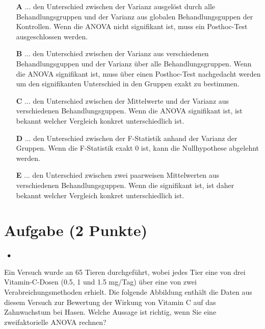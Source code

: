 \documentclass[a4paper, 9pt]{scrartcl}\usepackage[]{graphicx}\usepackage[]{xcolor}
\begin{document}
\begin{enumerate}
\item [\textbf{A} \msquare] ... den Unterschied zwischen der Varianz ausgelöst durch alle Behandlungsgruppen und der Varianz aus globalen Behandlungsguppen der Kontrollen. Wenn die ANOVA nicht signifikant ist, muss ein Posthoc-Test ausgeschlossen werden.
\item [\textbf{B} \msquare] ... den Unterschied zwischen der Varianz aus verschiedenen Behandlungsguppen und der Varianz über alle Behandlungsgruppen. Wenn die ANOVA signifikant ist, muss über einen Posthoc-Test nachgedacht werden um den signifikanten Unterschied in den Gruppen exakt zu bestimmen.
\item [\textbf{C} \msquare] ... den Unterschied zwischen der Mittelwerte und der Varianz aus verschiedenen Behandlungsguppen. Wenn die ANOVA signifikant ist, ist bekannt welcher Vergleich konkret unterschiedlich ist.
\item [\textbf{D} \msquare] ... den Unterschied zwischen der F-Statistik anhand der Varianz der Gruppen. Wenn die F-Statistik exakt 0 ist, kann die Nullhypothese abgelehnt werden.
\item [\textbf{E} \msquare] ... den Unterschied zwischen zwei paarweisen Mittelwerten aus verschiedenen Behandlungsguppen. Wenn die signifikant ist, ist daher bekannt welcher Vergleich konkret unterschiedlich ist.
\end{enumerate}

\section{Aufgabe \hfill (2 Punkte)}

\ifcollection
\begin{flushright}
\tiny\vspace{-2Ex}
\textbf{\examinhaltstart}
\exammodulestatversuch $\;\bullet$
\exammodulebiostat
\vspace{-1Ex}
\end{flushright}
\fi




Ein Versuch wurde an 65 Tieren durchgeführt, wobei jedes Tier eine von drei Vitamin-C-Dosen (0.5, 1 und 1.5 mg/Tag) über eine von zwei Verabreichungsmethoden erhielt. Die folgende Abbildung enthält die Daten aus diesem Versuch zur Bewertung der Wirkung von Vitamin C auf das Zahnwachstum bei Hasen.  Welche Aussage ist richtig, wenn Sie eine zweifaktorielle ANOVA rechnen?
\end{document}
